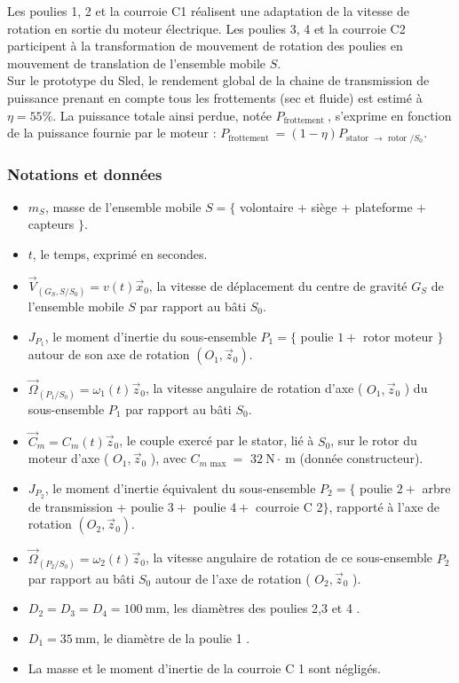 Les poulies 1, 2 et la courroie C1 réalisent une adaptation de la vitesse de rotation en sortie du moteur électrique. Les poulies 3, 4 et la courroie C2 participent à la transformation de mouvement de rotation des poulies en mouvement de translation de l'ensemble mobile $S$.\\
Sur le prototype du Sled, le rendement global de la chaine de transmission de puissance prenant en compte tous les frottements (sec et fluide) est estimé à $\eta=55 \%$. La puissance totale ainsi perdue, notée $P_{\text {frottement }}$, s'exprime en fonction de la puissance fournie par le moteur : $P_{\text {frottement }}=(1-\eta) P_{\text {stator } \rightarrow \text { rotor } / S_{0}}$.

\subsubsection*{Notations et données}
\begin{itemize}
  \item $m_{S}$, masse de l'ensemble mobile $S=\{$ volontaire + siège + plateforme + capteurs $\}$.
  \item $t$, le temps, exprimé en secondes.
  \item $\vec{V}_{\left(G_{S}, S / S_{0}\right)}=v(t) \vec{x}_{0}$, la vitesse de déplacement du centre de gravité $G_{S}$ de l'ensemble mobile $S$ par rapport au bâti $S_{0}$.
  \item $J_{P_{1}}$, le moment d'inertie du sous-ensemble $P_{1}=\{$ poulie $1+$ rotor moteur $\}$ autour de son axe de rotation $\left(O_{1}, \vec{z}_{0}\right)$.
  \item $\vec{\Omega}_{\left(P_{1} / S_{0}\right)}=\omega_{1}(t) \vec{z}_{0}$, la vitesse angulaire de rotation d'axe ( $O_{1}, \vec{z}_{0}$ ) du sous-ensemble $P_{1}$ par rapport au bâti $S_{0}$.
  \item $\vec{C}_{m}=C_{m}(t) \vec{z}_{0}$, le couple exercé par le stator, lié à $S_{0}$, sur le rotor du moteur d'axe ( $O_{1}, \vec{z}_{0}$ ), avec $C_{m \text { max }}=$ $32 \mathrm{~N} \cdot \mathrm{~m}$ (donnée constructeur).
  \item $J_{P_{2}}$, le moment d'inertie équivalent du sous-ensemble $P_{2}=\{$ poulie $2+$ arbre de transmission + poulie $3+$ poulie $4+$ courroie C 2$\}$, rapporté à l'axe de rotation $\left(O_{2}, \vec{z}_{0}\right)$.
  \item $\vec{\Omega}_{\left(P_{2} / S_{0}\right)}=\omega_{2}(t) \vec{z}_{0}$, la vitesse angulaire de rotation de ce sous-ensemble $P_{2}$ par rapport au bâti $S_{0}$ autour de l'axe de rotation ( $O_{2}, \vec{z}_{0}$ ).
  \item $D_{2}=D_{3}=D_{4}=100 \mathrm{~mm}$, les diamètres des poulies 2,3 et 4 .
  \item $D_{1}=35 \mathrm{~mm}$, le diamètre de la poulie 1 .
  \item La masse et le moment d'inertie de la courroie C 1 sont négligés.
\end{itemize}
\fi

